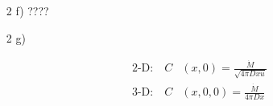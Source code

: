 \documentclass[11pt]{article}
\begin{document}
\begin{enumerate}
\item[2 f)]
????

\item[2 g)]

\begin{align}
\mbox{2-D:}\,\,\,\,\,\, C&(x,0) = \frac{\dot{M}}{\sqrt{4\pi Dxu}}\nonumber\\
\mbox{3-D:}\,\,\,\,\,\, C&(x,0,0) = \frac{\dot{M}}{4\pi Dx}\nonumber
\end{align}



\end{enumerate}
\end{document}
